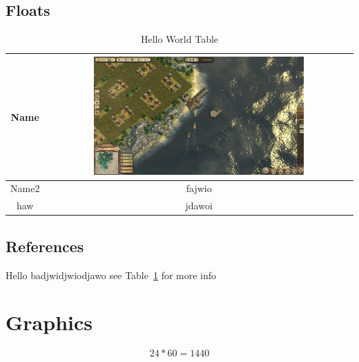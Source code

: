 \documentclass[11pt]{article}
\begin{document}
    \subsection{Floats}
    \begin{table}[htbp]
        \caption{Hello World Table}
        \begin{center}
            \begin{tabular}{|c|c|}
                \hline
                Name  & \includegraphics[width=0.7\textwidth]{Anno 1404 - History Edition2021-2-2-1-53-42} \\
                \hline
                Name2 & fajwio                                                                             \\
                \hline
                haw   & jdawoi                                                                             \\
                \hline
            \end{tabular}
        \end{center}
        \label{tab:Important Stuff}
    \end{table}

    \subsection{References}
    Hello badjwidjwiodjawo see Table~\ref{tab:Important Stuff} for more info



    \section{Graphics}
    \begin{equation}
        24*60=1440
        \label{eq:equation}

    \end{equation}
\end{document}

